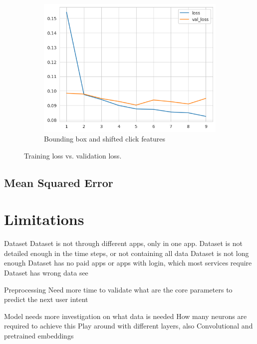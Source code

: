 \begin{figure}[htbp!]
\begin{subfigure}[b]{0.8\textwidth}
    \centering
    \includegraphics[width=\textwidth]{graphics/model_history_loss_features}
    \caption{Bounding box and shifted click features}
    \label{fig:model_history_loss_features_shifted}
  \end{subfigure}
  \caption[Training loss vs. validation loss]{Training loss vs. validation loss.}
  \label{fig:model_history_losses}
\end{figure}

\subsection{Mean Squared Error}

\section{Limitations}

Dataset
Dataset is not through different apps, only in one app.
Dataset is not detailed enough in the time steps, or not containing all data
Dataset is not long enough
Dataset has no paid apps or apps with login, which most services require
Dataset has wrong data see \cite{clay}

Preprocessing
Need more time to validate what are the core parameters to predict the next user intent


Model needs more investigation on what data is needed
How many neurons are required to achieve this
Play around with different layers, also Convolutional and pretrained embeddings

